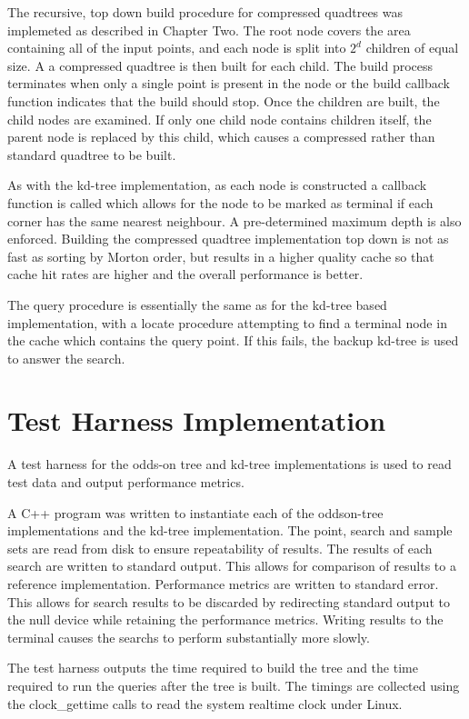 \documentclass[mcs]{scsthesis}
\begin{document}
The recursive, top down build procedure for compressed quadtrees was implemeted
as described in Chapter Two. The root node covers the area containing all of the
input points, and each node is split into \(2^d\) children of equal size. A 
a compressed quadtree is then built for each child. The build process terminates
when only a single point is present in the node or the build callback function
indicates that the build should stop. Once the children are built, the child
nodes are examined. If only one child node contains children itself, the parent
node is replaced by this child, which causes a compressed rather than standard
quadtree to be built.

As with the kd-tree implementation, as each node is constructed a callback
function is called which allows for the node to be marked as terminal if each
corner has the same nearest neighbour. A pre-determined maximum depth is also
enforced. Building the compressed quadtree implementation top down is not as
fast as sorting by Morton order, but results in a higher quality cache so that
cache hit rates are higher and the overall performance is better. 

The query procedure is essentially the same as for the kd-tree based
implementation, with a locate procedure attempting to find a terminal node in
the cache which contains the query point. If this fails, the backup kd-tree is
used to answer the search.

\section{Test Harness Implementation}

A test harness for the odds-on tree and kd-tree implementations is used to
read test data and output performance metrics.

A C++ program was written to instantiate each of the oddson-tree implementations
and the kd-tree implementation. The point, search and sample sets are read from
disk to ensure repeatability of results. The results of each search are written
to standard output. This allows for comparison of results to a reference
implementation. Performance metrics are written to standard error. This allows
for search results to be discarded by redirecting standard output to the null
device while retaining the performance metrics. Writing results to the terminal
causes the searchs to perform substantially more slowly.

The test harness outputs the time required to build the tree and the time
required to run the queries after the tree is built. The timings are collected
using the clock\_gettime calls to read the system realtime clock under Linux. 
\end{document}
